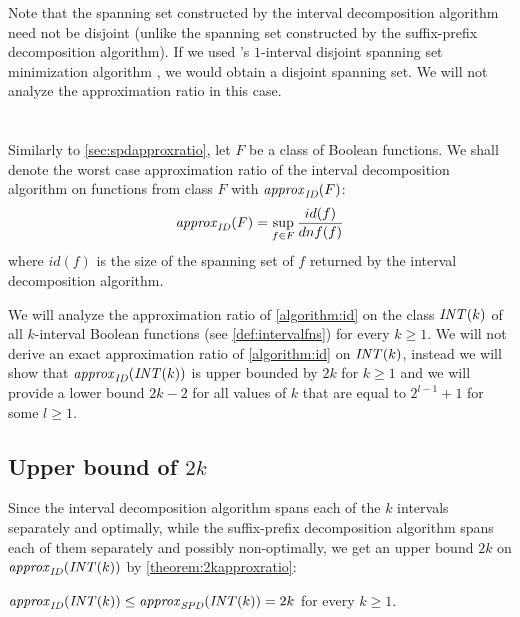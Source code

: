 Note that the spanning set constructed
by the interval decomposition algorithm
need not be disjoint
(unlike the spanning set constructed
by the suffix-prefix decomposition algorithm).
If we used \citeauthor{Schieber2005154}'s
$1$-interval disjoint spanning set minimization algorithm
\citep{Schieber2005154},
we would obtain a disjoint spanning set.
We will not analyze the approximation ratio in this case.

\section{\titleapproxratio}

Similarly to \cref{sec:spdapproxratio},
let $F$ be a class of Boolean functions.
We shall denote the worst case approximation ratio
of the interval decomposition algorithm
on functions from class $F$ with $\mathit{approx}_{\mathit{ID}} (F)$:
$$
\mathit{approx}_{\mathit{ID}} (F)
= \sup_{f \in F}{\frac{id(f)}{dnf(f)}}
$$
where $id(f)$ is the size of the spanning set of $f$
returned by the interval decomposition algorithm.

We will analyze the approximation ratio
of \cref{algorithm:id}
on the class $\mathit{INT} (k)$
of all $k$-interval Boolean functions
(see \cref{def:intervalfns})
for every $k \geq 1$.
We will not derive an exact approximation ratio of \cref{algorithm:id} on $\mathit{INT} (k)$,
instead we will show that $\mathit{approx}_{\mathit{ID}} (\mathit{INT} (k))$ is upper bounded by $2k$ for $k \geq 1$
and we will provide a lower bound $2k-2$
for all values of $k$
that are equal to $2^{l-1} + 1$ for some $l \geq 1$.

\subsection{Upper bound of \texorpdfstring{$2k$}{2k}}

Since the interval decomposition algorithm
spans each of the $k$ intervals separately and optimally,
while the suffix-prefix decomposition algorithm
spans each of them separately and possibly non-optimally,
we get an upper bound $2k$
on $\mathit{approx}_{\mathit{ID}} (\mathit{INT} (k))$ by \cref{theorem:2kapproxratio}:

\begin{observation}
\label{observation:approxidintkupper}
$\mathit{approx}_{\mathit{ID}} (\mathit{INT} (k)) \leq \mathit{approx}_{\mathit{SPD}} (\mathit{INT} (k)) = 2k$
for every $k \geq 1$.
\end{observation}

